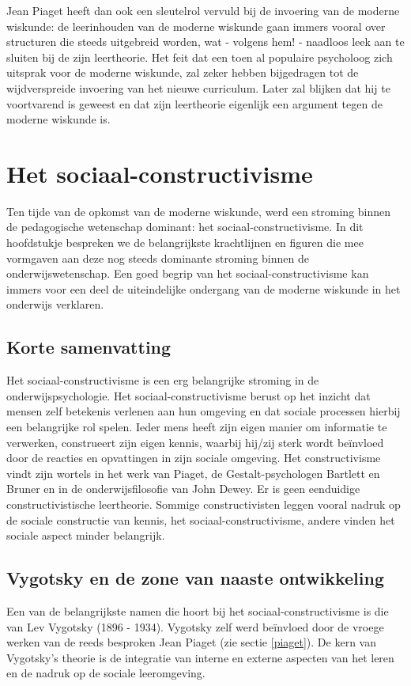 \documentclass[a4paper,11pt]{article}
\begin{document}
\noindent Jean Piaget heeft dan ook een sleutelrol vervuld bij de invoering van 
de moderne wiskunde: de leerinhouden van de moderne wiskunde gaan immers vooral 
over structuren die steeds uitgebreid worden, wat - volgens hem! - naadloos leek aan te sluiten bij de 
zijn leertheorie. Het feit dat een toen al populaire psycholoog zich 
uitsprak voor de moderne wiskunde, zal zeker hebben bijgedragen tot de 
wijdverspreide invoering van het nieuwe curriculum. Later zal blijken dat hij te 
voortvarend is geweest en dat zijn leertheorie eigenlijk een argument tegen de 
moderne wiskunde is. 

\newpage
\section{Het sociaal-constructivisme}
Ten tijde van de opkomst van de moderne wiskunde, werd een stroming binnen de 
pedagogische wetenschap dominant: het sociaal-constructivisme. In dit 
hoofdstukje bespreken we de belangrijkste krachtlijnen en figuren die mee 
vormgaven aan deze nog steeds dominante stroming binnen de onderwijswetenschap. 
Een goed begrip van het sociaal-constructivisme kan immers voor een deel de 
uiteindelijke ondergang van de moderne wiskunde in het onderwijs verklaren.

\subsection{Korte samenvatting}
Het sociaal-constructivisme is een erg belangrijke stroming in de onderwijspsychologie. Het
sociaal-constructivisme berust op het inzicht dat mensen zelf betekenis verlenen aan hun
omgeving en dat sociale processen hierbij een belangrijke rol spelen. Ieder mens heeft zijn
eigen manier om informatie te verwerken, construeert zijn eigen kennis, waarbij hij/zij sterk
wordt beïnvloed door de reacties en opvattingen in zijn sociale omgeving. Het constructivisme
vindt zijn wortels in het werk van Piaget, de Gestalt-psychologen Bartlett en Bruner en in
de onderwijsfilosofie van John Dewey. Er is geen eenduidige constructivistische leertheorie.
Sommige constructivisten leggen vooral nadruk op de sociale constructie van kennis, het
sociaal-constructivisme, andere vinden het sociale aspect minder belangrijk.

\subsection{Vygotsky en de zone van naaste ontwikkeling}
Een van de belangrijkste namen die hoort bij het sociaal-constructivisme is die van Lev 
Vygotsky (1896 - 1934). Vygotsky zelf werd beïnvloed door de vroege werken van
de reeds besproken Jean Piaget (zie sectie \ref{piaget}). De kern van Vygotsky’s theorie is de integratie van interne en externe 
aspecten van
het leren en de nadruk op de sociale leeromgeving. \\
\end{document}

